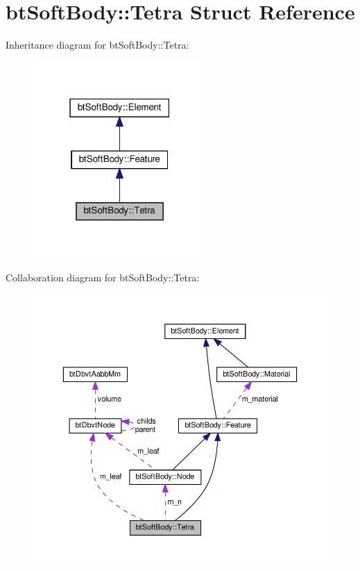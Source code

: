 \hypertarget{structbtSoftBody_1_1Tetra}{}\section{bt\+Soft\+Body\+:\+:Tetra Struct Reference}
\label{structbtSoftBody_1_1Tetra}


Inheritance diagram for bt\+Soft\+Body\+:\+:Tetra\+:
\nopagebreak
\begin{figure}[H]
\begin{center}
\leavevmode
\includegraphics[width=187pt]{structbtSoftBody_1_1Tetra__inherit__graph}
\end{center}
\end{figure}


Collaboration diagram for bt\+Soft\+Body\+:\+:Tetra\+:
\nopagebreak
\begin{figure}[H]
\begin{center}
\leavevmode
\includegraphics[width=350pt]{structbtSoftBody_1_1Tetra__coll__graph}
\end{center}
\end{figure}
